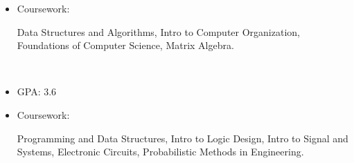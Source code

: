 \newcommand{\TUBentry}{
    \TUB
    \poswithprd{Introduction to 3D Scanning and Printing at TUB Winter University}{Jan 2018-Feb 2018}
    \begin{itemize}
        \item 
        Learned the basic of 3D scanning \& printing. Learned Blender for 3D modeling.
    \end{itemize}
}



\UM
{}
\begin{itemize}
    \item Coursework: 
    \begin{minipage}[t]{\courseworkwidth}
        Data Structures and Algorithms,
        Intro to Computer Organization,
        Foundations of Computer Science,
        Matrix Algebra.
    \end{minipage}\\
\end{itemize}

\JI
{}
\begin{itemize}
    \item GPA: 3.6
    \item Coursework:
    \begin{minipage}[t]{\courseworkwidth}
        Programming and Data Structures,
        Intro to Logic Design,
        Intro to Signal and Systems,
        Electronic Circuits,
        Probabilistic Methods in Engineering.
    \end{minipage}\\
\end{itemize}